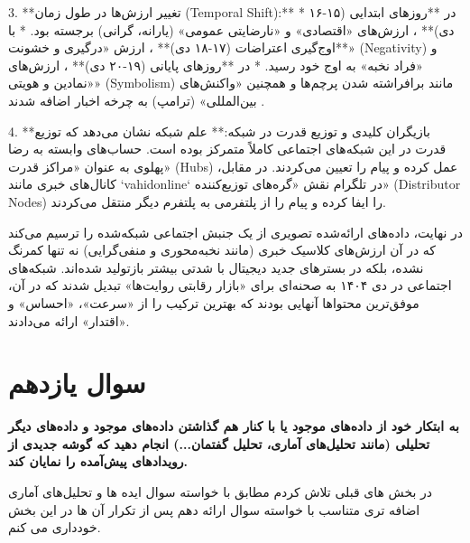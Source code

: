 \documentclass{article}
\begin{document}
3.  **تغییر ارزش‌ها در طول زمان (Temporal Shift):**
*   در **روزهای ابتدایی (۱۵-۱۶ دی)** ، ارزش‌های «اقتصادی» و «نارضایتی عمومی» (یارانه، گرانی) برجسته بود.
*   با **اوج‌گیری اعتراضات (۱۷-۱۸ دی)** ، ارزش «درگیری و خشونت» (Negativity) و «فراد نخبه» به اوج خود رسید.
*   در **روزهای پایانی (۱۹-۲۰ دی)** ، ارزش‌های «نمادین و هویتی» (Symbolism) مانند برافراشته شدن پرچم‌ها و همچنین «واکنش‌های بین‌المللی» (ترامپ) به چرخه اخبار اضافه شدند .

4.  **بازیگران کلیدی و توزیع قدرت در شبکه:** علم شبکه نشان می‌دهد که توزیع قدرت در این شبکه‌های اجتماعی کاملاً متمرکز بوده است. حساب‌های وابسته به رضا پهلوی به عنوان «مراکز قدرت» (Hubs) عمل کرده و پیام را تعیین می‌کردند. در مقابل، کانال‌های خبری مانند `vahidonline` در تلگرام نقش «گره‌های توزیع‌کننده» (Distributor Nodes) را ایفا کرده و پیام را از پلتفرمی به پلتفرم دیگر منتقل می‌کردند.

در نهایت، داده‌های ارائه‌شده تصویری از یک جنبش اجتماعی شبکه‌شده را ترسیم می‌کند که در آن ارزش‌های کلاسیک خبری (مانند نخبه‌محوری و منفی‌گرایی) نه تنها کمرنگ نشده، بلکه در بسترهای جدید دیجیتال با شدتی بیشتر بازتولید شده‌اند. شبکه‌های اجتماعی در دی ۱۴۰۴ به صحنه‌ای برای «بازار رقابتی روایت‌ها» تبدیل شدند که در آن، موفق‌ترین محتواها آنهایی بودند که بهترین ترکیب را از «سرعت»، «احساس» و «اقتدار» ارائه می‌دادند.

\section{سوال یازدهم}
\textbf{به ابتکار خود از داده‌های موجود یا با کنار هم گذاشتن داده‌های موجود و داده‌های دیگر تحلیلی (مانند تحلیل‌های آماری، تحلیل گفتمان...) انجام دهید که گوشه جدیدی از رویدادهای پیش‌آمده را نمایان کند.}

در بخش های قبلی تلاش کردم مطابق با خواسته سوال ایده ها و تحلیل‌های آماری اضافه تری متناسب با خواسته سوال ارائه دهم پس از تکرار آن ها در این بخش خودداری می کنم.







\begin{latin}
  	

\end{latin}
\end{document}
